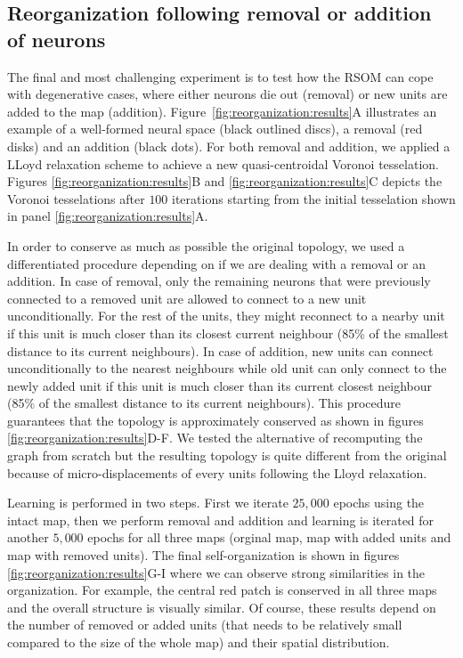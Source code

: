 \subsection{Reorganization following removal or addition of neurons}

The final and most challenging experiment is to test how the RSOM can cope
with degenerative cases, where either neurons die out (removal) or new units are added to the map (addition). Figure~\ref{fig:reorganization:results}A illustrates an example of a well-formed neural space (black outlined discs), a removal (red disks) and an addition (black dots). For both removal and addition, we applied a LLoyd relaxation scheme to achieve a new quasi-centroidal Voronoi tesselation. Figures \ref{fig:reorganization:results}B and \ref{fig:reorganization:results}C depicts the Voronoi tesselations after $100$ iterations starting from the initial tesselation shown in panel \ref{fig:reorganization:results}A. 

In order to conserve as much as possible the original topology, we used a differentiated procedure depending on if we are dealing with a removal or an addition. In case of removal, only the remaining neurons that were previously connected to a removed unit are allowed to connect to a new unit unconditionally. For the rest of the units, they might reconnect to a nearby unit if this unit is much closer than its closest current neighbour (85\% of the smallest distance to its current neighbours). In case of addition, new units can connect unconditionally to the nearest neighbours while old unit can only connect to the newly added unit if this unit is much closer than its current closest neighbour (85\% of the smallest distance to its current neighbours). This procedure guarantees that the topology is approximately conserved as shown in figures \ref{fig:reorganization:results}D-F. We tested the alternative of recomputing the graph from scratch but the resulting topology is quite different from the original because of micro-displacements of every units following the Lloyd relaxation.

Learning is performed in two steps. First we iterate $25,000$ epochs using the intact map, then we perform removal and addition and learning is iterated for another $5,000$ epochs for all three maps (orginal map, map with added units and map with removed units). The final self-organization is shown in figures \ref{fig:reorganization:results}G-I where we can observe strong similarities in the organization. For example, the central red patch is conserved in all three maps and the overall structure is visually similar. Of course, these results depend on the number of removed or added units (that needs to be relatively small compared to the size of the whole map) and their spatial distribution.

